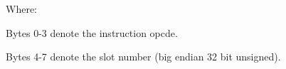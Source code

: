 Where:
  
Bytes 0-3 denote the instruction opcde.

Bytes 4-7 denote the slot number
(big endian 32 bit unsigned).
